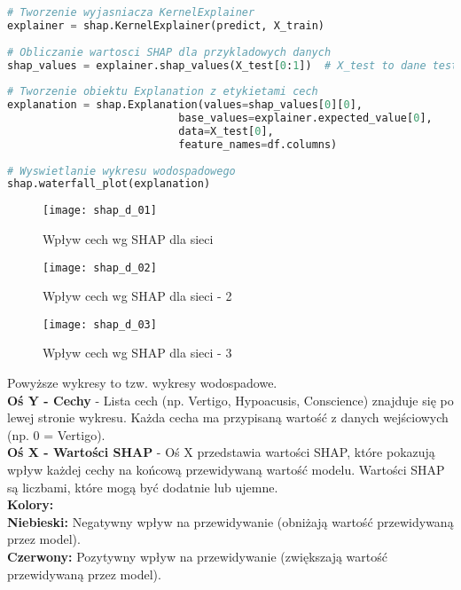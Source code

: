 \begin{lstlisting}[language=Python, caption=Definicja explainera dla SHAP - 2]
# Tworzenie wyjasniacza KernelExplainer
explainer = shap.KernelExplainer(predict, X_train)
    
# Obliczanie wartosci SHAP dla przykladowych danych
shap_values = explainer.shap_values(X_test[0:1])  # X_test to dane testowe, wybieramy przyklad 0
    
# Tworzenie obiektu Explanation z etykietami cech
explanation = shap.Explanation(values=shap_values[0][0], 
                           base_values=explainer.expected_value[0], 
                           data=X_test[0],
                           feature_names=df.columns)
    
# Wyswietlanie wykresu wodospadowego
shap.waterfall_plot(explanation)
\end{lstlisting}

\begin{figure}[H]
    \centering
    \texttt{[image: shap\_d\_01]}
    \caption{Wpływ cech wg SHAP dla sieci}
    \label{fig:shap_d_01}
\end{figure}

\begin{figure}[H]
    \centering
    \texttt{[image: shap\_d\_02]}
    \caption{Wpływ cech wg SHAP dla sieci - 2}
    \label{fig:shap_d_02}
\end{figure}

\begin{figure}[H]
    \centering
    \texttt{[image: shap\_d\_03]}
    \caption{Wpływ cech wg SHAP dla sieci - 3}
    \label{fig:shap_d_03}
\end{figure}

Powyższe wykresy to tzw. wykresy wodospadowe.\\
\noindent\textbf{Oś Y - Cechy} - Lista cech (np. Vertigo, Hypoacusis, Conscience) znajduje się po lewej stronie wykresu. Każda cecha ma przypisaną wartość z danych wejściowych (np. 0 = Vertigo).\\
\noindent\textbf{Oś X - Wartości SHAP} - Oś X przedstawia wartości SHAP, które pokazują wpływ każdej cechy na końcową przewidywaną wartość modelu. Wartości SHAP są liczbami, które mogą być dodatnie lub ujemne.\\

\textbf{Kolory:}\\
\noindent\textbf{Niebieski:} Negatywny wpływ na przewidywanie (obniżają wartość przewidywaną przez model).\\
\noindent\textbf{Czerwony:} Pozytywny wpływ na przewidywanie (zwiększają wartość przewidywaną przez model).\\

